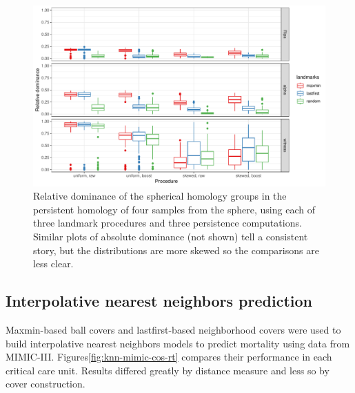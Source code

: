 \documentclass{article}
\begin{document}
\begin{figure}
\includegraphics[width=\textwidth]{../figures/homology-sphere-relative}
\caption{
Relative dominance of the spherical homology groups in the persistent homology of four samples from the sphere, using each of three landmark procedures and three persistence computations. Similar plots of absolute dominance (not shown) tell a consistent story, but the distributions are more skewed so the comparisons are less clear.
\label{fig:sphere}
}
\end{figure}

\hypertarget{interpolative-nearest-neighbors-prediction-2}{%
\subsection{Interpolative nearest neighbors
prediction}\label{interpolative-nearest-neighbors-prediction-2}}

Maxmin-based ball covers and lastfirst-based neighborhood covers were
used to build interpolative nearest neighbors models to predict
mortality using data from MIMIC-III.
Figures\nbs\ref{fig:knn-mimic-cos-rt} compares their performance in each
critical care unit. Results differed greatly by distance measure and
less so by cover construction.
\end{document}
